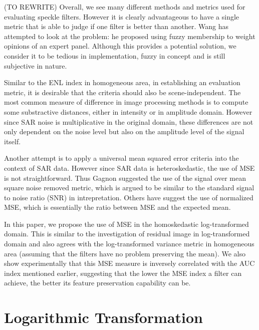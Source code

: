 \documentclass[journal]{IEEEtran}
\begin{document}
(TO REWRITE) Overall, we see many different methods and metrics used for evaluating speckle filters. However it is clearly advantageous to have a single metric that is able to judge if one filter is better than another. Wang \cite{Wang_2005_MIPR} has attempted to look at the problem: he proposed using fuzzy membership to weight opinions of an expert panel. Although this provides a potential solution, we consider it to be tedious in implementation, fuzzy in concept and is still subjective in nature.

Similar to the ENL index in homogeneous area, in establishing an evaluation metric, 
	it is desirable that the criteria should also be scene-independent\cite{Shi_IGARSS_1994}.
The most common measure of difference in image processing methods is to compute some substractive distances, either in intensity or in amplitude domain. 
However since SAR noise is multiplicative in the original domain, these differences are not only dependent on the noise level but also on the amplitude level of the signal itself.

Another attempt is to apply a universal mean squared error criteria into the context of SAR data. However since SAR data is heteroskedastic, the use of MSE is not straightforward. 
Thus Gagnon \cite{Gagnon_SPIEProc_1997} suggested the use of the signal over mean square noise removed metric, which is argued to be similar to the standard signal to noise ratio (SNR) in intrepretation. Others have suggest the use of normalized MSE, which is essentially the ratio between MSE and the expected mean.

In this paper, we propose the use of MSE in the homoskedastic log-transformed domain. This is similar to the investigation of residual image in log-transformed domain and also agrees with the log-transformed variance metric in homogeneous area (assuming that the filters have no problem preserving the mean). We also show experimentally that this MSE measure is inversely correlated with the AUC index mentioned earlier, suggesting that the lower the MSE index a filter can achieve, the better its feature preservation capability can be.

\section{Logarithmic Transformation}
\label{sec:log_transform}
\end{document}
